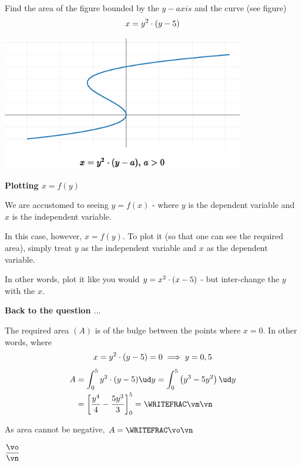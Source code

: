 

\POWER{}\vb
\FRACTIONSIMPLIFY{}\vm\vn
\ABSVALUE\vm\vo

\question[3] Find the area of the figure bounded by the $y-axis$ and the curve (see figure)
\[ x=y^2\cdot(y-5) \]

\watchout

\includegraphics[width=300pt]{plotly.eps}

\begin{solution}[\halfpage]
  \textbf{Plotting $x=f(y)$}

  We are accustomed to seeing $y=f(x)$ - where $y$ is the dependent variable and 
  $x$ is the independent variable. 
  
  In this case, however, $x=f(y)$. To plot it (so that one can see the required area), 
  simply treat $y$ as the independent variable and $x$ as the dependent variable. 

  In other words, plot it like you would $y=x^2\cdot (x-5)$ - but inter-change 
  the $y$ with the $x$. 

  \textbf{Back to the question $\ldots$}

  The required area $(A)$ is of the bulge between the points where $x=0$. In other words, where 
  \[ x = y^2\cdot(y-5) = 0\implies y = 0, 5 \]
  \begin{align}
     A &= \int_0^{\va} y^2\cdot(y-\va)\ud y 
     = \int_0^{\va}\left(y^3-\va y^2\right)\ud y \\
       &= \left[ \dfrac{y^4}{4} - \dfrac{\va y^3}{3}\right]_0^{\va} = \WRITEFRAC\vm\vn
  \end{align}
  
  As area cannot be negative, $A=\WRITEFRAC\vo\vn$
\end{solution}

\ifprintanswers
  \begin{codex}
    $\dfrac\vo\vn$
  \end{codex}
\fi
